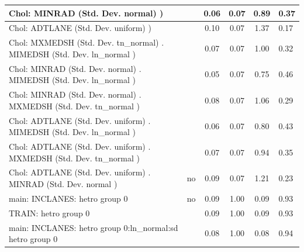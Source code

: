 \begin{table}
\begin{center}
\begin{tabular}{|l|l|c|c|c|l|}
			\hline
			 Chol: MINRAD (Std. Dev. normal) ) &  & 0.06 & 0.07 & 0.89 & 0.37 \\
			\hline
			 Chol: ADTLANE (Std. Dev. uniform) ) &  & 0.10 & 0.07 & 1.37 & 0.17 \\
			\hline
			 Chol: MXMEDSH (Std. Dev. tn_normal) . MIMEDSH (Std. Dev.   ln_normal ) &  & 0.07 & 0.07 & 1.00 & 0.32 \\
			\hline
			 Chol: MINRAD (Std. Dev. normal) . MIMEDSH (Std. Dev.   ln_normal ) &  & 0.05 & 0.07 & 0.75 & 0.46 \\
			\hline
			 Chol: MINRAD (Std. Dev. normal) . MXMEDSH (Std. Dev.   tn_normal ) &  & 0.08 & 0.07 & 1.06 & 0.29 \\
			\hline
			 Chol: ADTLANE (Std. Dev. uniform) . MIMEDSH (Std. Dev.   ln_normal ) &  & 0.06 & 0.07 & 0.80 & 0.43 \\
			\hline
			 Chol: ADTLANE (Std. Dev. uniform) . MXMEDSH (Std. Dev.   tn_normal ) &  & 0.07 & 0.07 & 0.94 & 0.35 \\
			\hline
			 Chol: ADTLANE (Std. Dev. uniform) . MINRAD (Std. Dev.   normal ) & no & 0.09 & 0.07 & 1.21 & 0.23 \\
			\hline
			main: INCLANES: hetro group 0 & no & 0.09 & 1.00 & 0.09 & 0.93 \\
			\hline
			TRAIN: hetro group 0 &  & 0.09 & 1.00 & 0.09 & 0.93 \\
			\hline
			main: INCLANES: hetro group 0:ln_normal:sd  hetro group 0 &  & 0.08 & 1.00 & 0.08 & 0.94 \\
			\hline
		\end{tabular}
	\end{center}
\end{table}
